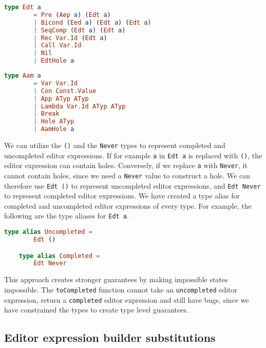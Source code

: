 \begin{lstlisting}[language=elm,%
                   label="generic-edt-definition",%
                   gobble=4,%
                   ]
    type Edt a
        = Pre (Aep a) (Edt a)
        | Bicond (Eed a) (Edt a) (Edt a)
        | SeqComp (Edt a) (Edt a)
        | Rec Var.Id (Edt a)
        | Call Var.Id
        | Nil
        | EdtHole a
\end{lstlisting}

\begin{lstlisting}[language=elm,%
                   label="aam-definitions",%
                   gobble=4,%
                   ]
    type Aam a
        = Var Var.Id
        | Con Const.Value
        | App ATyp ATyp
        | Lambda Var.Id ATyp ATyp
        | Break
        | Hole ATyp
        | AamHole a
\end{lstlisting}

We can utilize the \texttt{()} and the \texttt{Never} types to represent
completed and uncompleted editor expressions. If for example \texttt{a} in
\texttt{Edt a} is replaced with \texttt{()}, the editor expression can contain
holes. Conversely, if we replace \texttt{a} with \texttt{Never}, it cannot
contain holes, since we need a \texttt{Never} value to construct a hole. We can
therefore use \texttt{Edt ()} to represent uncompleted editor expressions, and
\texttt{Edt Never} to represent completed editor expressions. We have created a
type alias for completed and uncompleted editor expressions of every type. For
example, the following are the type aliases for \texttt{Edt a}.

\begin{lstlisting}[language=elm,%
                   label="completed-and-uncompleted-edts",%
                   gobble=4,%
                   ]
    type alias Uncompleted =
        Edt ()

    type alias Completed =
        Edt Never
\end{lstlisting}

This approach creates stronger guarantees by making impossible states
impossible. The \texttt{toCompleted} function cannot take an
\texttt{uncompleted} editor expression, return a \texttt{completed} editor
expression and still have bugs, since we have constrained the types to create
type level guarantees.


\subsection{Editor expression builder substitutions}

